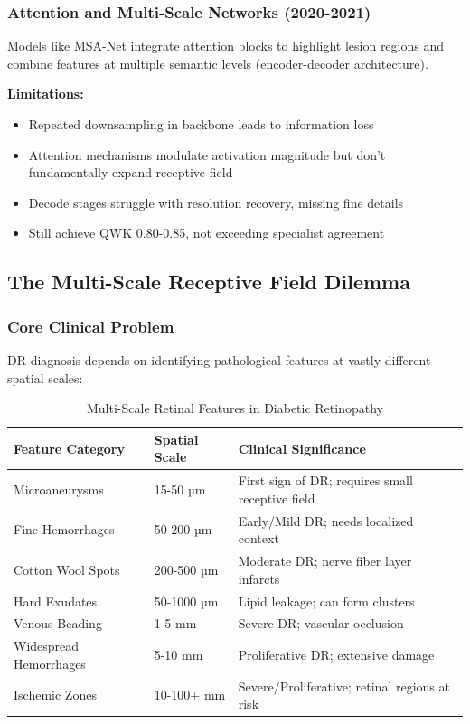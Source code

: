 \documentclass[12pt,a4paper]{article}
\begin{document}
\subsubsection{Attention and Multi-Scale Networks (2020-2021)}

Models like MSA-Net integrate attention blocks to highlight lesion regions and combine features at multiple semantic levels (encoder-decoder architecture).

\textbf{Limitations:}
\begin{itemize}
    \item Repeated downsampling in backbone leads to information loss
    \item Attention mechanisms modulate activation magnitude but don't fundamentally expand receptive field
    \item Decode stages struggle with resolution recovery, missing fine details
    \item Still achieve QWK 0.80-0.85, not exceeding specialist agreement
\end{itemize}

\subsection{The Multi-Scale Receptive Field Dilemma}

\subsubsection{Core Clinical Problem}

DR diagnosis depends on identifying pathological features at vastly different spatial scales:

\begin{table}[H]
\centering
\small
\caption{Multi-Scale Retinal Features in Diabetic Retinopathy}
\begin{tabular}{|p{2.5cm}|p{3cm}|p{3.5cm}|}
\hline
\textbf{Feature Category} & \textbf{Spatial Scale} & \textbf{Clinical Significance} \\
\hline
Microaneurysms & 15-50 µm & First sign of DR; requires small receptive field \\
Fine Hemorrhages & 50-200 µm & Early/Mild DR; needs localized context \\
Cotton Wool Spots & 200-500 µm & Moderate DR; nerve fiber layer infarcts \\
Hard Exudates & 50-1000 µm & Lipid leakage; can form clusters \\
Venous Beading & 1-5 mm & Severe DR; vascular occlusion \\
Widespread Hemorrhages & 5-10 mm & Proliferative DR; extensive damage \\
Ischemic Zones & 10-100+ mm & Severe/Proliferative; retinal regions at risk \\
\hline
\end{tabular}
\end{table}
\end{document}
